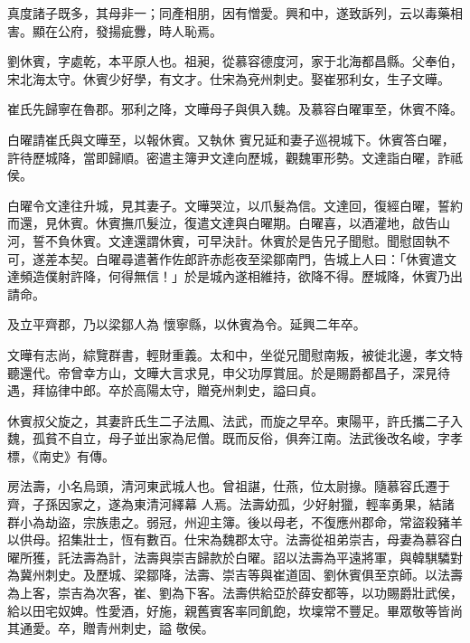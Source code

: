 \begin{pinyinscope}
 真度諸子既多，其母非一；同產相朋，因有憎愛。興和中，遂致訴列，云以毒藥相害。顯在公府，發揚疵釁，時人恥焉。



 劉休賓，字處乾，本平原人也。祖昶，從慕容德度河，家于北海都昌縣。父奉伯，宋北海太守。休賓少好學，有文才。仕宋為兗州刺史。娶崔邪利女，生子文曄。



 崔氏先歸寧在魯郡。邪利之降，文曄母子與俱入魏。及慕容白曜軍至，休賓不降。



 白曜請崔氏與文曄至，以報休賓。又執休
 賓兄延和妻子巡視城下。休賓答白曜，許待歷城降，當即歸順。密遣主簿尹文達向歷城，觀魏軍形勢。文達詣白曜，詐祗侯。



 白曜令文達往升城，見其妻子。文曄哭泣，以爪髮為信。文達回，復經白曜，誓約而還，見休賓。休賓撫爪髮泣，復遣文達與白曜期。白曜喜，以酒灌地，啟告山河，誓不負休賓。文達還謂休賓，可早決計。休賓於是告兄子聞慰。聞慰固執不可，遂差本契。白曜尋遣著作佐郎許赤彪夜至梁鄒南門，告城上人曰：「休賓遣文達頻造僕射許降，何得無信！」於是城內遂相維持，欲降不得。歷城降，休賓乃出請命。



 及立平齊郡，乃以梁鄒人為
 懷寧縣，以休賓為令。延興二年卒。



 文曄有志尚，綜覽群書，輕財重義。太和中，坐從兄聞慰南叛，被徙北邊，孝文特聽還代。帝曾幸方山，文曄大言求見，申父功厚賞屈。於是賜爵都昌子，深見待遇，拜協律中郎。卒於高陽太守，贈兗州刺史，謚曰貞。



 休賓叔父旋之，其妻許氏生二子法鳳、法武，而旋之早卒。東陽平，許氏攜二子入魏，孤貧不自立，母子並出家為尼僧。既而反俗，俱奔江南。法武後改名峻，字孝標，《南史》有傳。



 房法壽，小名烏頭，清河東武城人也。曾祖諶，仕燕，位太尉掾。隨慕容氏遷于齊，子孫因家之，遂為東清河繹幕
 人焉。法壽幼孤，少好射獵，輕率勇果，結諸群小為劫盜，宗族患之。弱冠，州迎主簿。後以母老，不復應州郡命，常盜殺豬羊以供母。招集壯士，恆有數百。仕宋為魏郡太守。法壽從祖弟崇吉，母妻為慕容白曜所獲，託法壽為計，法壽與崇吉歸款於白曜。詔以法壽為平遠將軍，與韓騏驎對為冀州刺史。及歷城、梁鄒降，法壽、崇吉等與崔道固、劉休賓俱至京師。以法壽為上客，崇吉為次客，崔、劉為下客。法壽供給亞於薛安都等，以功賜爵壯武侯，給以田宅奴婢。性愛酒，好施，親舊賓客率同飢飽，坎壈常不豐足。畢眾敬等皆尚其通愛。卒，贈青州刺史，謚
 敬侯。




\end{pinyinscope}

